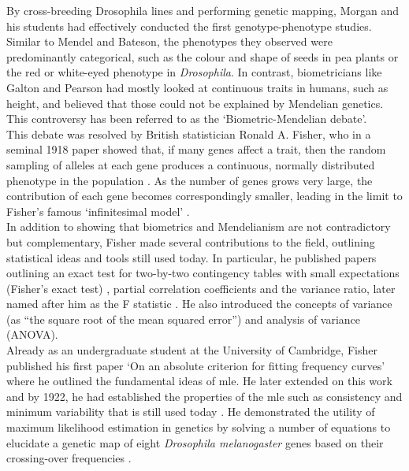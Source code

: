 By cross-breeding Drosophila lines and performing genetic mapping, Morgan and his students had effectively conducted the first genotype-phenotype studies. 
Similar to Mendel and Bateson, the phenotypes they observed were predominantly categorical, such as the colour and shape of seeds in pea plants or the red or white-eyed phenotype in \textit{Drosophila}. 
In contrast, biometricians like Galton and Pearson had mostly looked at continuous traits in humans, such as height, and believed that those could not be explained by Mendelian genetics.
This controversy has been referred to as the `Biometric-Mendelian debate'.\\ 

This debate was resolved by British statistician Ronald A. Fisher, who in a seminal 1918 paper showed that, if many genes affect a trait, then the random sampling of alleles at each gene produces a continuous, normally distributed phenotype in the population \cite{fisher1919xv}. 
As the number of genes grows very large, the contribution of each gene becomes correspondingly smaller, leading in the limit to Fisher’s famous `infinitesimal model' \cite{barton2017infinitesimal}.\\

In addition to showing that biometrics and Mendelianism are not contradictory but complementary, Fisher made several contributions to the field, outlining statistical ideas and tools still used today. 
In particular, he published papers outlining an exact test for two-by-two contingency tables with small expectations (Fisher’s exact test) \cite{fisher1922interpretation}, partial correlation coefficients \cite{fisher1924distribution} and the variance ratio, later named after him as the F statistic \cite{fisher1924036}. 
He also introduced the concepts of variance (as “the square root of the mean squared error”) and analysis of variance (ANOVA). \\

Already as an undergraduate student at the University of Cambridge, Fisher published his first paper `On an absolute criterion for fitting frequency curves' where he outlined the fundamental ideas of \gls{mle}. 
He later extended on this work and by 1922, he had established the properties of the \gls{mle} such as consistency and minimum variability \cite{fisher1922mathematical} that is still used today \cite{hald1999history}. 
He demonstrated the utility of maximum likelihood estimation in genetics by solving a number of equations to elucidate a genetic map of eight \textit{Drosophila melanogaster} genes based on their crossing-over frequencies \cite{fisher1922systematic}.\\

